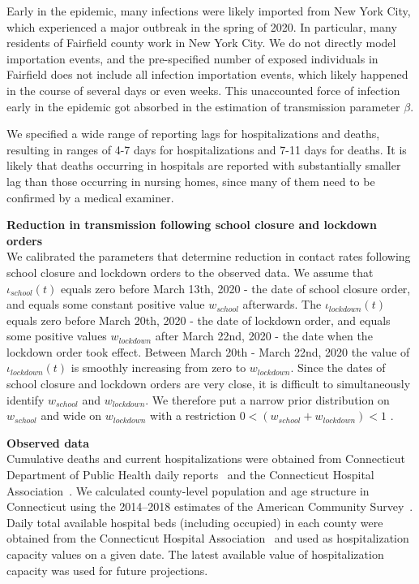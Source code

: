 \documentclass[11pt]{article}
\begin{document}
Early in the epidemic, many infections were likely imported from New York City, which experienced a major outbreak in the spring of 2020. In particular, many residents of Fairfield county work in New York City. We do not directly model importation events, and the pre-specified number of exposed individuals in Fairfield does not include all infection importation events, which likely happened in the course of several days or even weeks. This unaccounted force of infection early in the epidemic got absorbed in the estimation of transmission parameter $\beta$.

We specified a wide range of reporting lags for hospitalizations and deaths, resulting in ranges of 4-7 days for hospitalizations and 7-11 days for deaths. It is likely that deaths occurring in hospitals are reported with substantially smaller lag than those occurring in nursing homes, since many of them need to be confirmed by a medical examiner.  

\textbf{Reduction in transmission following school closure and lockdown orders} \\[0.5em]
We calibrated the parameters that determine reduction in contact rates following school closure and lockdown orders to the observed data. 
We assume that $\iota_{school}(t)$ equals zero before March 13th, 2020 - the date of school closure order, and equals some constant positive value $w_{school}$ afterwards. 
The  $\iota_{lockdown} (t)$ equals zero before March 20th, 2020 - the date of lockdown order, and equals some positive values $w_{lockdown}$ after March 22nd, 2020 - the date when the lockdown order took effect. Between March 20th - March 22nd, 2020 the value of $\iota_{lockdown} (t)$ is smoothly increasing from zero to $w_{lockdown}$. 
Since the dates of school closure and lockdown orders are very close, it is difficult to simultaneously identify $w_{school}$ and $w_{lockdown}$. We therefore put a narrow prior distribution on $w_{school}$ and wide on $w_{lockdown}$ with a restriction $ 0 < (w_{school} + w_{lockdown}) < 1$ . 


\textbf{Observed data} \\[0.5em]
Cumulative deaths and current hospitalizations were obtained from Connecticut Department of Public Health daily reports~\citep{DPHwebsite} and the Connecticut Hospital Association~\citep{CHAwebsite}. 
We calculated county-level population and age structure in Connecticut using the 2014--2018 estimates of the American Community Survey~\citep{acs2018}. 
Daily total available hospital beds (including occupied) in each county were obtained from the Connecticut Hospital Association~\citep{CHAwebsite} and used as hospitalization capacity values on a given date. The latest available value of hospitalization capacity was used for future projections.
\end{document}
